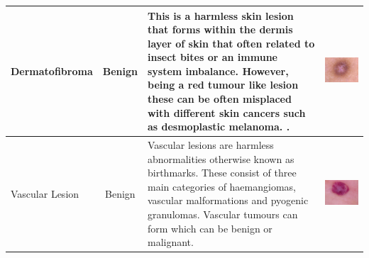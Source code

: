 \documentclass[12pt]{report}
\begin{document}
{\begin{tabular}{|m{3cm}|c|m{15cm}|m{3cm}|}
	\\
	\hline
	Dermatofibroma & Benign & 
	This is a harmless skin lesion that forms within the dermis layer of skin that often related to insect bites or an immune system imbalance. However, being a red tumour like lesion these can be often misplaced with different skin cancers such as desmoplastic melanoma. \cite{Chen2013}. & 
	\includegraphics[scale=0.15]{figure-2-fibro.jpg} 
	\\
	\hline
	Vascular Lesion & Benign & 
	Vascular lesions are harmless abnormalities otherwise known as birthmarks. These consist of three main categories of haemangiomas, vascular malformations and pyogenic granulomas. Vascular tumours can form which can be benign or malignant. & 
	\includegraphics[scale=0.15]{figure-2-vasc.jpg} 

\end{tabular}}
\end{document}
